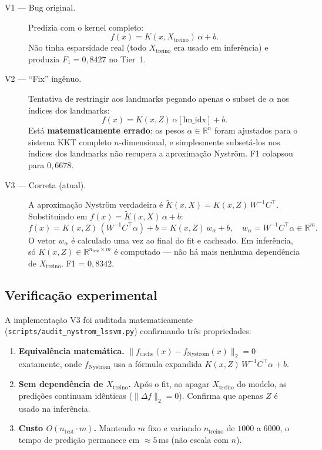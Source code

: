 \documentclass[12pt,a4paper]{article}
\begin{document}
\begin{description}
  \item[V1 --- Bug original.] Predizia com o kernel completo:
  \[
    f(x) = K(x, X_\text{treino})\,\alpha + b.
  \]
  Não tinha esparsidade real (todo $X_\text{treino}$ era usado em inferência) e
  produzia $F_1 = 0{,}8427$ no Tier~1.

  \item[V2 --- ``Fix'' ingênuo.] Tentativa de restringir aos landmarks pegando
  apenas o subset de $\alpha$ nos índices dos landmarks:
  \[
    f(x) = K(x, Z)\,\alpha[\text{lm\_idx}] + b.
  \]
  Está \textbf{matematicamente errado}: os pesos $\alpha \in \mathbb{R}^n$ foram
  ajustados para o sistema KKT completo $n$-dimensional, e simplesmente subsetá-los
  nos índices dos landmarks não recupera a aproximação Nyström. F1 colapsou para
  $0{,}6678$.

  \item[V3 --- Correta (atual).] A aproximação Nyström verdadeira é
  $\tilde K(x, X) = K(x, Z)\,W^{-1} C^\top$. Substituindo em
  $f(x) = \tilde K(x, X)\,\alpha + b$:
  \[
    f(x) = K(x, Z)\,(W^{-1} C^\top \alpha) + b
         = K(x, Z)\,w_\alpha + b, \quad
    w_\alpha = W^{-1} C^\top \alpha \in \mathbb{R}^m.
  \]
  O vetor $w_\alpha$ é calculado uma vez ao final do fit e cacheado.
  Em inferência, só $K(x, Z) \in \mathbb{R}^{n_\text{test} \times m}$ é computado
  --- não há mais nenhuma dependência de $X_\text{treino}$. F1 = $0{,}8342$.
\end{description}

\subsection{Verificação experimental}

A implementação V3 foi auditada matematicamente
(\texttt{scripts/audit\_nystrom\_lssvm.py}) confirmando três propriedades:

\begin{enumerate}
  \item \textbf{Equivalência matemática.}
  $\|f_\text{cache}(x) - f_\text{Nyström}(x)\|_2 = 0$
  exatamente, onde $f_\text{Nyström}$ usa a fórmula expandida
  $K(x, Z)\,W^{-1} C^\top \alpha + b$.

  \item \textbf{Sem dependência de $X_\text{treino}$.} Após o fit, ao apagar
  $X_\text{treino}$ do modelo, as predições continuam idênticas
  ($\|\Delta f\|_2 = 0$). Confirma que apenas $Z$ é usado na inferência.

  \item \textbf{Custo $O(n_\text{test} \cdot m)$.} Mantendo $m$ fixo e variando
  $n_\text{treino}$ de $1000$ a $6000$, o tempo de predição permanece em
  $\approx 5$\,ms (não escala com $n$).
\end{enumerate}
\end{document}
